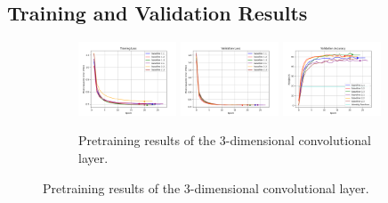\documentclass[./main.tex]{subfiles}
\begin{document}
\subsection{Training and Validation Results}
\label{subsec:finetune_train_val_res}
\begin{figure}[htbp]
    \centering
     \begin{subfigure}[b]{\textwidth}
         \centering
         \includegraphics[width=0.32\textwidth]{./entities/finetuned/baseline/train_losses.png}
         \includegraphics[width=0.32\textwidth]{./entities/finetuned/baseline/val_losses.png}
         \includegraphics[width=0.32\textwidth]{./entities/finetuned/baseline/val_accs.png}
         \caption{Pretraining results of the 3-dimensional convolutional layer.}
     \end{subfigure}
    \hfill


\end{figure}
\end{document}
